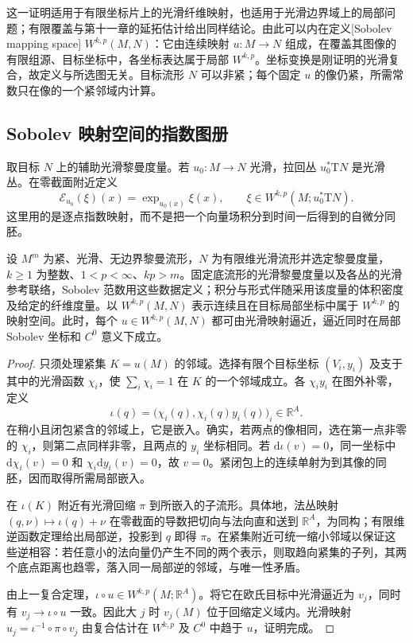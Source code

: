 这一证明适用于有限坐标片上的光滑纤维映射，也适用于光滑边界域上的局部问题；有限覆盖与第十一章的延拓估计给出同样结论。由此可以内在定义[Sobolev mapping space] \(W^{k,p}(M,N)\)：它由连续映射 \(u:M\to N\) 组成，在覆盖其图像的有限组源、目标坐标中，各坐标表达属于局部 \(W^{k,p}\)。坐标变换是刚证明的光滑复合，故定义与所选图无关。目标流形 \(N\) 可以非紧；每个固定 \(u\) 的像仍紧，所需常数只在像的一个紧邻域内计算。

\subsection{Sobolev 映射空间的指数图册}
\label{g3:subsec:1306:02}
取目标 \(N\) 上的辅助光滑黎曼度量。若 \(u_0:M\to N\) 光滑，拉回丛 \(u_0^*\mathrm TN\) 是光滑丛。在零截面附近定义
\begin{equation}\label{g3:eq:sobolev-exponential-chart}
	\mathcal E_{u_0}(\xi)(x)=\exp_{u_0(x)}\xi(x),
	\qquad\xi\in W^{k,p}(M;u_0^*\mathrm TN).
\end{equation}
这里用的是逐点指数映射，而不是把一个向量场积分到时间一后得到的自微分同胚。

\begin{lemma}\label{g3:lem:sobolev-map-smooth-density}
	设 \(M^m\) 为紧、光滑、无边界黎曼流形，\(N\) 为有限维光滑流形并选定黎曼度量，\(k\ge1\) 为整数、\(1<p<\infty\)、\(kp>m\)。固定底流形的光滑黎曼度量以及各丛的光滑参考联络，Sobolev 范数用这些数据定义；积分与形式伴随采用该度量的体积密度及给定的纤维度量。以 \(W^{k,p}(M,N)\) 表示连续且在目标局部坐标中属于 \(W^{k,p}\) 的映射空间。此时，每个 \(u\in W^{k,p}(M,N)\) 都可由光滑映射逼近，逼近同时在局部 Sobolev 坐标和 \(C^0\) 意义下成立。
\end{lemma}
\begin{proof}
	只须处理紧集 \(K=u(M)\) 的邻域。选择有限个目标坐标 \((V_i,y_i)\) 及支于其中的光滑函数 \(\chi_i\)，使 \(\sum_i\chi_i=1\) 在 \(K\) 的一个邻域成立。各 \(\chi_i y_i\) 在图外补零，定义
	\[
		\iota(q)=\bigl(\chi_i(q),\chi_i(q)y_i(q)\bigr)_i\in\mathbb R^A.
	\]
	在稍小且闭包紧含的邻域上，它是嵌入。确实，若两点的像相同，选在第一点非零的 \(\chi_i\)，则第二点同样非零，且两点的 \(y_i\) 坐标相同。若 \(\mathrm d\iota(v)=0\)，同一坐标中 \(\mathrm d\chi_i(v)=0\) 和 \(\chi_i\mathrm dy_i(v)=0\)，故 \(v=0\)。紧闭包上的连续单射为到其像的同胚，因而取得所需局部嵌入。

	在 \(\iota(K)\) 附近有光滑回缩 \(\pi\) 到所嵌入的子流形。具体地，法丛映射 \((q,\nu)\mapsto\iota(q)+\nu\) 在零截面的导数把切向与法向直和送到 \(\mathbb R^A\)，为同构；有限维逆函数定理给出局部逆，投影到 \(q\) 即得 \(\pi\)。在紧集附近可统一缩小邻域以保证这些逆相容：若任意小的法向量仍产生不同的两个表示，则取趋向紧集的子列，其两个底点距离也趋零，落入同一局部逆的邻域，与唯一性矛盾。

	由上一复合定理，\(\iota\circ u\in W^{k,p}(M;\mathbb R^A)\)。将它在欧氏目标中光滑逼近为 \(v_j\)，同时有 \(v_j\to\iota\circ u\) 一致。因此大 \(j\) 时 \(v_j(M)\) 位于回缩定义域内。光滑映射 \(u_j=\iota^{-1}\circ\pi\circ v_j\) 由复合估计在 \(W^{k,p}\) 及 \(C^0\) 中趋于 \(u\)，证明完成。
\end{proof}

